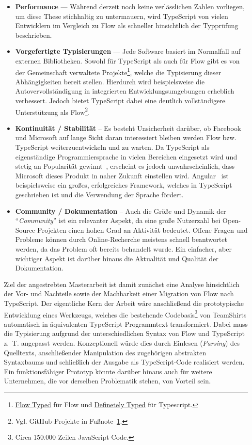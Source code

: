 \begin{itemize}
    \item
        \textbf{Performance} --- Während derzeit noch keine verlässlichen Zahlen vorliegen, um diese These stichhaltig zu untermauern, wird TypeScript von vielen Entwicklern im Vergleich zu Flow als schneller hinsichtlich der Typprüfung beschrieben.
    \item
        \textbf{Vorgefertigte Typisierungen} --- Jede Software basiert im Normalfall auf externen Bibliotheken. Sowohl für TypeScript als auch für Flow gibt es von der Gemeinschaft verwaltete Projekte\footnote{\href{https://github.com/flow-typed/flow-typed}{Flow Typed} für Flow und \href{https://github.com/DefinitelyTyped/DefinitelyTyped}{Definetely Typed} für Typescript.\label{github-projects}}, welche die Typisierung dieser Abhängigkeiten bereit stellen. Hierdurch wird beispielsweise die Autovervollständigung in integrierten Entwicklungsumgebungen erheblich verbessert. Jedoch bietet TypeScript dabei eine deutlich vollständigere Unterstützung als Flow\footnote{Vgl. GitHub-Projekte in Fußnote~\ref{github-projects}.}.
    \item
        \textbf{Kontinuität / Stabilität} -- Es besteht Unsicherheit darüber, ob Facebook und Microsoft auf lange Sicht daran interessiert bleiben werden Flow bzw. TypeScript weiterzuentwickeln und zu warten. Da TypeScript als eigenständige Programmiersprache in vielen Bereichen eingesetzt wird und stetig an Popularität gewinnt~\autocite{stackoverflow:survey:2018}, erscheint es jedoch unwahrscheinlich, dass Microsoft dieses Produkt in naher Zukunft einstellen wird. Angular~\autocite{angular} ist beispielsweise ein großes, erfolgreiches Framework, welches in TypeScript geschrieben ist und die Verwendung der Sprache fördert.
    \item
        \textbf{Community / Dokumentation} -- Auch die Größe und Dynamik der \enquote{\emph{Community}} ist ein relevanter Aspekt, da eine große Nutzerzahl bei Open-Source-Projekten einen hohen Grad an Aktivität bedeutet. Offene Fragen und Probleme können durch Online-Recherche meistens schnell beantwortet werden, da das Problem oft bereits behandelt wurde. Ein einfacher, aber wichtiger Aspekt ist darüber hinaus die Aktualität und Qualität der Dokumentation.
\end{itemize}

Ziel der angestrebten Masterarbeit ist damit zunächst eine Analyse hinsichtlich der Vor- und Nachteile sowie der Machbarkeit einer Migration von Flow nach TypeScript. Der eigentliche Kern der Arbeit wäre anschließend die prototypische Entwicklung eines Werkzeugs, welches die bestehende Codebasis\footnote{Circa 150.000 Zeilen JavaScript-Code.} von TeamShirts automatisch in äquivalenten TypeScript-Programm\-text transformiert. Dabei muss die Typisierung aufgrund der unterschiedlichen Syntax von Flow und TypeScript z.~T. angepasst werden. Konzeptionell würde dies durch Einlesen (\emph{Parsing}) des Quelltexts, anschließender Manipulation des zugehörigen abstrakten Syntaxbaums und schließlich der Ausgabe als TypeScript-Code realisiert werden.
Ein funktionsfähiger Prototyp könnte darüber hinaus auch für weitere Unternehmen, die vor derselben Problematik stehen, von Vorteil sein.
